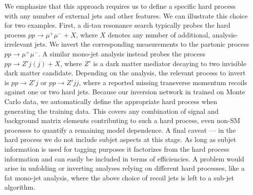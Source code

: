 We emphasize that this approach requires us to define a specific hard
process with any number of external jets and other features. We can
illustrate this choice for two examples. First, a di-tau resonance
search typically probes the hard process $pp \to \mu^+ \mu^-+X$, where
$X$ denotes any number of additional, analysis-irrelevant jets. We
invert the corresponding measurements to the partonic process $pp \to
\mu^+ \mu^-$. A similar mono-jet analysis instead probes the process
$pp \to Z' j (j) +X$, where $Z'$ is a dark matter mediator decaying to
two invisible dark matter candidate. Depending on the analysis, the
relevant process to invert is $pp \to Z' j$ or $pp \to Z' jj$, where a
reported missing transverse momentum recoils against one or two hard
jets. Because our inversion network in trained on Monte Carlo data, we
automatically define the appropriate hard process when generating the
training data. This covers any combination of signal and background
matrix elements contributing to such a hard process, even non-SM
processes to quantify a remaining model dependence. A final caveat ---
in the hard process we do not include subjet aspects at this stage. As
long as subjet information is used for tagging purposes it factorizes
from the hard process information and can easily be included in terms
of efficiencies. A problem would arise in unfolding or inverting
analyses relying on different hard processes, like a fat mono-jet
analysis, where the above choice of recoil jets is left to a sub-jet
algorithm.

